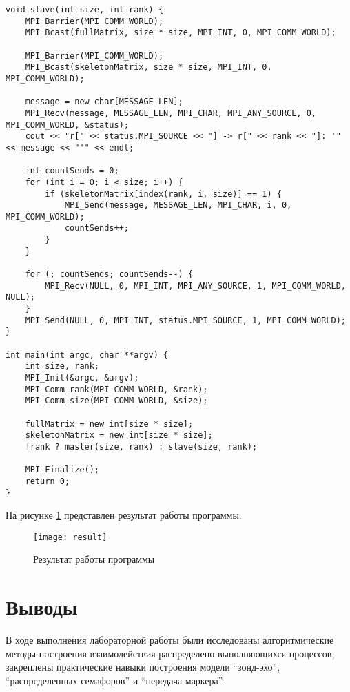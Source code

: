 \documentclass[a4paper,14pt]{extarticle}
\begin{document}
\begin{lstlisting}
void slave(int size, int rank) { 
    MPI_Barrier(MPI_COMM_WORLD); 
    MPI_Bcast(fullMatrix, size * size, MPI_INT, 0, MPI_COMM_WORLD); 
  
    MPI_Barrier(MPI_COMM_WORLD); 
    MPI_Bcast(skeletonMatrix, size * size, MPI_INT, 0, MPI_COMM_WORLD); 
  
    message = new char[MESSAGE_LEN]; 
    MPI_Recv(message, MESSAGE_LEN, MPI_CHAR, MPI_ANY_SOURCE, 0, MPI_COMM_WORLD, &status); 
    cout << "r[" << status.MPI_SOURCE << "] -> r[" << rank << "]: '" << message << "'" << endl; 
  
    int countSends = 0; 
    for (int i = 0; i < size; i++) { 
        if (skeletonMatrix[index(rank, i, size)] == 1) { 
            MPI_Send(message, MESSAGE_LEN, MPI_CHAR, i, 0, MPI_COMM_WORLD); 
            countSends++; 
        } 
    } 
  
    for (; countSends; countSends--) { 
        MPI_Recv(NULL, 0, MPI_INT, MPI_ANY_SOURCE, 1, MPI_COMM_WORLD, NULL); 
    } 
    MPI_Send(NULL, 0, MPI_INT, status.MPI_SOURCE, 1, MPI_COMM_WORLD); 
} 
  
int main(int argc, char **argv) { 
    int size, rank; 
    MPI_Init(&argc, &argv); 
    MPI_Comm_rank(MPI_COMM_WORLD, &rank); 
    MPI_Comm_size(MPI_COMM_WORLD, &size); 
  
    fullMatrix = new int[size * size]; 
    skeletonMatrix = new int[size * size]; 
    !rank ? master(size, rank) : slave(size, rank); 
  
    MPI_Finalize(); 
    return 0; 
}  
\end{lstlisting}

На рисунке \ref{fig:result} представлен результат работы программы:
\begin{figure}[H]
    \centering
    \texttt{[image: result]}
    \caption{Результат работы программы}
    \label{fig:result}
\end{figure}

\section*{Выводы}
В ходе выполнения лабораторной работы были исследованы алгоритмические методы
построения взаимодействия распределено выполняющихся процессов, закреплены
практические навыки построения модели \enquote{зонд-эхо},
\enquote{распределенных семафоров} и \enquote{передача маркера}.
\end{document}
